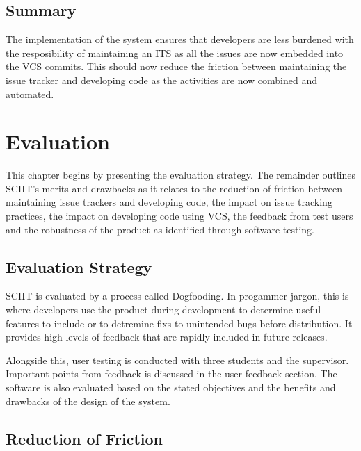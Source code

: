 \documentclass{mproj}
\begin{document}
\section{Summary}

The implementation of the system ensures that developers are less burdened with the resposibility of maintaining an ITS as all the issues are now embedded into the VCS  commits. This should now reduce the friction between maintaining the issue tracker and developing code as the activities are now combined and automated.







\chapter{Evaluation}\label{evaluation}



This chapter begins by presenting the evaluation strategy. The remainder outlines SCIIT's merits and drawbacks as it relates to the reduction of friction between maintaining issue trackers and developing code, the impact on issue tracking practices, the impact on developing code using VCS, the feedback from test users and the robustness of the product as identified through software testing. 

\section{Evaluation Strategy}

SCIIT is evaluated by a process called Dogfooding. In progammer jargon, this is where developers use the product during development to determine useful features to include or to detremine fixs to unintended bugs before distribution. It provides high levels of feedback that are rapidly included in future releases. 

Alongside this, user testing is conducted with three students and the supervisor. Important points from feedback is discussed in the user feedback section. The software is also evaluated based on the stated objectives and the benefits and drawbacks of the design of the system.


\section{Reduction of Friction}
\end{document}
